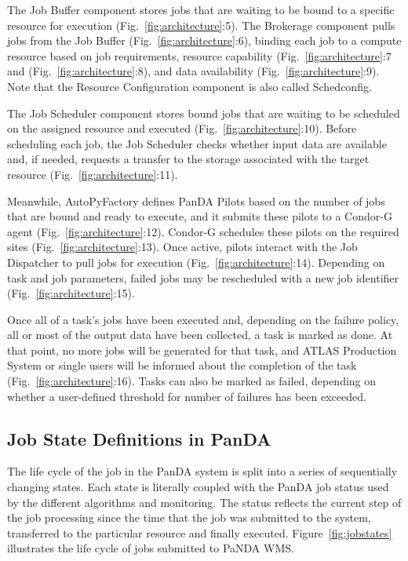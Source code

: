 The Job Buffer component stores jobs that are waiting to be bound to a
specific resource for execution (Fig.~\ref{fig:architecture}:5). The Brokerage
component pulls jobs from the Job Buffer (Fig.~\ref{fig:architecture}:6),
binding each job to a compute resource based on job requirements, resource
capability (Fig.~\ref{fig:architecture}:7 and (Fig.~\ref{fig:architecture}:8),
and data availability (Fig.~\ref{fig:architecture}:9). Note that the Resource
Configuration component is also called Schedconfig.

The Job Scheduler component stores bound jobs that are waiting to be scheduled
on the assigned resource and executed (Fig.~\ref{fig:architecture}:10). Before
scheduling each job, the Job Scheduler checks whether input data are available
and, if needed, requests a transfer to the storage associated with the target
resource (Fig.~\ref{fig:architecture}:11).

Meanwhile, AutoPyFactory defines PanDA Pilots based on the number of jobs that
are bound and ready to execute, and it submits these pilots to a Condor-G agent
(Fig.~\ref{fig:architecture}:12). Condor-G schedules these pilots on the
required sites (Fig.~\ref{fig:architecture}:13). Once active, pilots interact
with the Job Dispatcher to pull jobs for execution
(Fig.~\ref{fig:architecture}:14). Depending on task and job parameters, failed
jobs may be rescheduled with a new job identifier
(Fig.~\ref{fig:architecture}:15).

Once all of a task's jobs have been executed and, depending on the failure
policy, all or most of the output data have been collected, a task is marked as
done. At that point, no more jobs will be generated for that task, and ATLAS
Production System or single users will be informed about the completion of the
task (Fig.~\ref{fig:architecture}:16). Tasks can also be marked as failed,
depending on whether a user-defined threshold for number of failures has been
exceeded.


\subsection{Job State Definitions in PanDA}
\label{subsec:jobstatedefs}

The life cycle of the job in the PanDA system is split into a series of
sequentially changing states. Each state is literally coupled with the PanDA
job status used by the different algorithms and monitoring. The status reflects
the current step of the job processing since the time that the job was
submitted to the system, transferred to the particular resource and finally
executed. Figure~\ref{fig:jobstates} illustrates the life cycle of jobs
submitted to PaNDA WMS.

